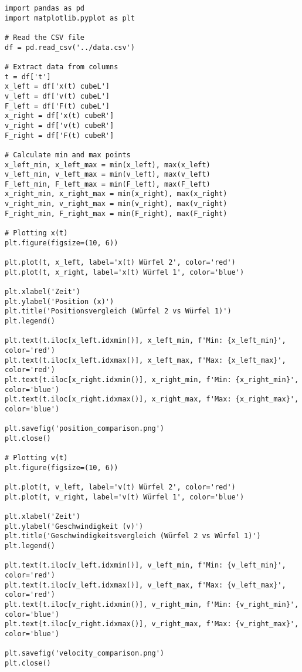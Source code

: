 \documentclass{article}
\begin{document}
\newpage
\begin{lstlisting}[caption={Plotter.py}, label={Plotter}, basicstyle=\ttfamily\small]
import pandas as pd
import matplotlib.pyplot as plt

# Read the CSV file
df = pd.read_csv('../data.csv')

# Extract data from columns
t = df['t']
x_left = df['x(t) cubeL']
v_left = df['v(t) cubeL']
F_left = df['F(t) cubeL']
x_right = df['x(t) cubeR']
v_right = df['v(t) cubeR']
F_right = df['F(t) cubeR']

# Calculate min and max points
x_left_min, x_left_max = min(x_left), max(x_left)
v_left_min, v_left_max = min(v_left), max(v_left)
F_left_min, F_left_max = min(F_left), max(F_left)
x_right_min, x_right_max = min(x_right), max(x_right)
v_right_min, v_right_max = min(v_right), max(v_right)
F_right_min, F_right_max = min(F_right), max(F_right)

# Plotting x(t)
plt.figure(figsize=(10, 6))

plt.plot(t, x_left, label='x(t) Würfel 2', color='red')
plt.plot(t, x_right, label='x(t) Würfel 1', color='blue')

plt.xlabel('Zeit')
plt.ylabel('Position (x)')
plt.title('Positionsvergleich (Würfel 2 vs Würfel 1)')
plt.legend()

plt.text(t.iloc[x_left.idxmin()], x_left_min, f'Min: {x_left_min}', color='red')
plt.text(t.iloc[x_left.idxmax()], x_left_max, f'Max: {x_left_max}', color='red')
plt.text(t.iloc[x_right.idxmin()], x_right_min, f'Min: {x_right_min}', color='blue')
plt.text(t.iloc[x_right.idxmax()], x_right_max, f'Max: {x_right_max}', color='blue')

plt.savefig('position_comparison.png')
plt.close()

# Plotting v(t)
plt.figure(figsize=(10, 6))

plt.plot(t, v_left, label='v(t) Würfel 2', color='red')
plt.plot(t, v_right, label='v(t) Würfel 1', color='blue')

plt.xlabel('Zeit')
plt.ylabel('Geschwindigkeit (v)')
plt.title('Geschwindigkeitsvergleich (Würfel 2 vs Würfel 1)')
plt.legend()

plt.text(t.iloc[v_left.idxmin()], v_left_min, f'Min: {v_left_min}', color='red')
plt.text(t.iloc[v_left.idxmax()], v_left_max, f'Max: {v_left_max}', color='red')
plt.text(t.iloc[v_right.idxmin()], v_right_min, f'Min: {v_right_min}', color='blue')
plt.text(t.iloc[v_right.idxmax()], v_right_max, f'Max: {v_right_max}', color='blue')

plt.savefig('velocity_comparison.png')
plt.close()


\end{lstlisting}
\end{document}

